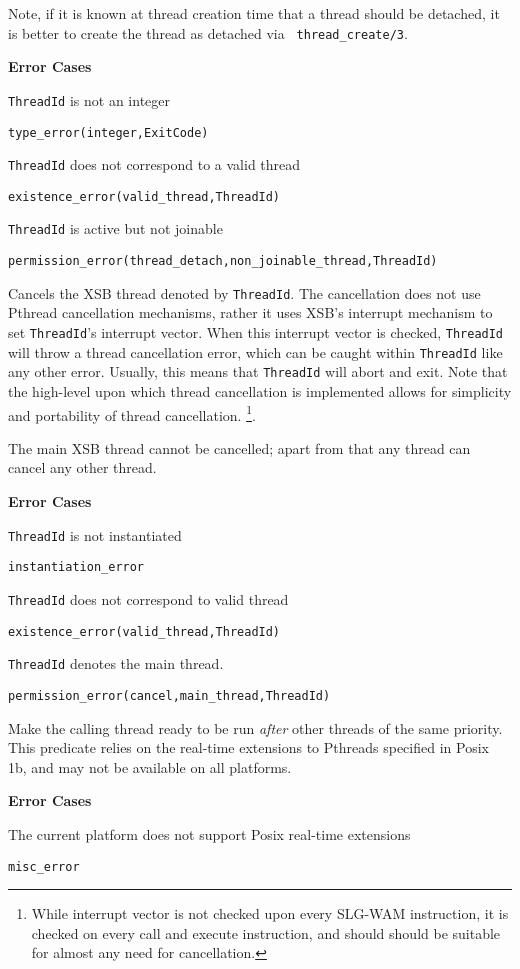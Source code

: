 \begin{description}
Note, if it is known at thread creation time that a thread should be
detached, it is better to create the thread as detached via {\tt
  thread\_create/3}.

{\bf Error Cases}
\bi
\item 	{\tt ThreadId} is not an integer
\bi
\item 	{\tt type\_error(integer,ExitCode)}
\ei
\item   {\tt ThreadId} does not correspond to a valid thread
\bi
\item   {\tt existence\_error(valid\_thread,ThreadId)}
\ei
\item 	{\tt ThreadId} is active but not joinable
\bi
\item 	{\tt permission\_error(thread\_detach,non\_joinable\_thread,ThreadId)}
\ei
\ei

%
Cancels the XSB thread denoted by {\tt ThreadId}.  The cancellation
does not use Pthread cancellation mechanisms, rather it uses XSB's
interrupt mechanism to set {\tt ThreadId}'s interrupt vector.  When
this interrupt vector is checked, {\tt ThreadId} will throw a thread
cancellation error, which can be caught within {\tt ThreadId} like any
other error.  Usually, this means that {\tt ThreadId} will abort and
exit.  Note that the high-level upon which thread cancellation is
implemented allows for simplicity and portability of thread
cancellation.  \footnote{While interrupt vector is not checked upon
  every SLG-WAM instruction, it is checked on every {\sf call} and
  {\sf execute} instruction, and should should be suitable for almost
  any need for cancellation.}.

The main XSB thread cannot be cancelled; apart from that any thread
can cancel any other thread.

{\bf Error Cases}
\bi
\item 	{\tt ThreadId} is not instantiated
\bi
\item 	{\tt instantiation\_error}
\ei
%
\item   {\tt ThreadId} does not correspond to valid thread
\bi
\item   {\tt existence\_error(valid\_thread,ThreadId)}
\ei
\item   {\tt ThreadId} denotes the main thread.
\bi
\item   {\tt permission\_error(cancel,main\_thread,ThreadId)}
\ei
\ei

% 
Make the calling thread ready to be run {\em after} other threads of
the same priority.  This predicate relies on the real-time extensions
to Pthreads specified in Posix 1b, and may not be available on all
platforms.

{\bf Error Cases}
\bi
\item 	The current platform does not support Posix real-time extensions
\bi
\item 	{\tt misc\_error}
\ei
\ei
\end{description}

